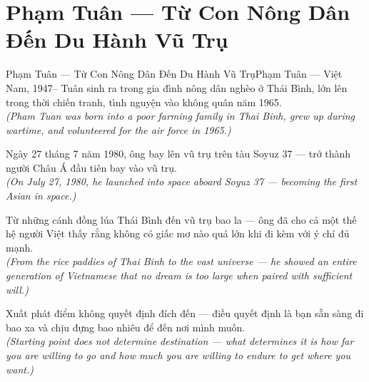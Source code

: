 \section{Phạm Tuân --- Từ Con Nông Dân Đến Du Hành Vũ Trụ}
\begin{truyen}{Phạm Tuân --- Từ Con Nông Dân Đến Du Hành Vũ Trụ}{Phạm Tuân --- Việt Nam, 1947--}
 Tuân sinh ra trong gia đình nông dân nghèo ở Thái Bình, lớn lên trong thời chiến tranh, tình nguyện vào không quân năm 1965.\\[4pt]
\textit{(Pham Tuan was born into a poor farming family in Thai Binh, grew up during wartime, and volunteered for the air force in 1965.)}

Ngày 27 tháng 7 năm 1980, ông bay lên vũ trụ trên tàu Soyuz 37 --- trở thành người Châu Á đầu tiên bay vào vũ trụ.\\[4pt]
\textit{(On July 27, 1980, he launched into space aboard Soyuz 37 --- becoming the first Asian in space.)}

Từ những cánh đồng lúa Thái Bình đến vũ trụ bao la --- ông đã cho cả một thế hệ người Việt thấy rằng không có giấc mơ nào quá lớn khi đi kèm với ý chí đủ mạnh.\\[4pt]
\textit{(From the rice paddies of Thai Binh to the vast universe --- he showed an entire generation of Vietnamese that no dream is too large when paired with sufficient will.)}

\end{truyen}
\begin{baihoc}
  Xuất phát điểm không quyết định đích đến --- điều quyết định là bạn sẵn sàng đi bao xa và chịu đựng bao nhiêu để đến nơi mình muốn.\\[4pt]
  \textit{(Starting point does not determine destination --- what determines it is how far you are willing to go and how much you are willing to endure to get where you want.)}
\end{baihoc}
